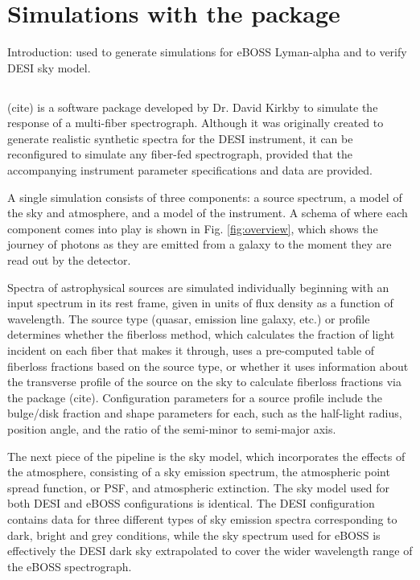 \chapter{Simulations with the  package}

Introduction: used to generate simulations for eBOSS Lyman-alpha and to verify DESI sky model. 

\section{}

 (cite) is a software package developed by Dr. David Kirkby to simulate the response of a multi-fiber spectrograph. Although it was originally created to generate realistic synthetic spectra for the DESI instrument, it can be reconfigured to simulate any fiber-fed spectrograph, provided that the accompanying instrument parameter specifications and data are provided. 

A single simulation consists of three components: a source spectrum, a model of the sky and atmosphere, and a model of the instrument. A schema of where each component comes into play is shown in Fig. \ref{fig:overview}, which shows the journey of photons as they are emitted from a galaxy to the moment they are read out by the detector. 

Spectra of astrophysical sources are simulated individually beginning with an input spectrum in its rest frame, given in units of flux density as a function of wavelength. The source type (quasar, emission line galaxy, etc.) or profile determines whether the fiberloss method, which calculates the fraction of light incident on each fiber that makes it through, uses a pre-computed table of fiberloss fractions based on the source type, or whether it uses information about the transverse profile of the source on the sky to calculate fiberloss fractions via the  package (cite). Configuration parameters for a source profile include the bulge/disk fraction and shape parameters for each, such as the half-light radius, position angle, and the ratio of the semi-minor to semi-major axis. 

The next piece of the  pipeline is the sky model, which incorporates the effects of the atmosphere, consisting of a sky emission spectrum, the atmospheric point spread function, or PSF, and atmospheric extinction. The sky model used for both DESI and eBOSS configurations is identical. The DESI configuration contains data for three different types of sky emission spectra corresponding to dark, bright and grey conditions, while the sky spectrum used for eBOSS is effectively the DESI dark sky extrapolated to cover the wider wavelength range of the eBOSS spectrograph.


